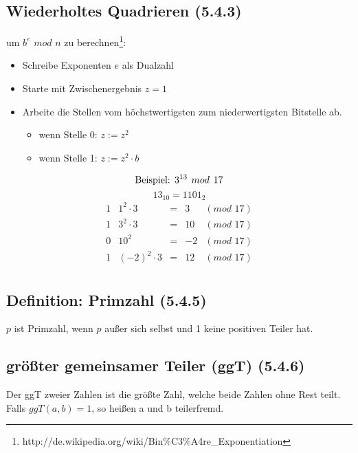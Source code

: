 \subsection{Wiederholtes Quadrieren (5.4.3)}
um $b^e \hspace{4pt} mod \hspace{4pt} n$ zu berechnen\footnote{http://de.wikipedia.org/wiki/Bin\%C3\%A4re\_Exponentiation}:
\begin{itemize}
  \item Schreibe Exponenten $e$ als Dualzahl
  \item Starte mit Zwischenergebnis $z = 1$
  \item Arbeite die Stellen vom höchstwertigsten zum niederwertigsten Bitstelle ab.
  	\begin{itemize}
  		\item wenn Stelle 0: $z := z^2$
  		\item wenn Stelle 1: $z := z^2 \cdot b$
		\end{itemize}
\end{itemize}

$$\textnormal{Beispiel: } 3^{13} \hspace{4pt} mod \hspace{4pt} 17$$
$$13_{10} = 1101_2$$
$$
\begin{array}{crclc}
	1 & 1^2 \cdot 3 & = & 3 &  (mod \hspace{4pt} 17) \\
	1 & 3^2 \cdot 3 & = & 10 &  (mod \hspace{4pt} 17) \\
	0 & 10^2 & = & -2 &  (mod \hspace{4pt} 17) \\
	1 & (-2)^2 \cdot 3 & = & 12 &  (mod \hspace{4pt} 17) \\
\end{array}
$$

\subsection{Definition: Primzahl (5.4.5)}
$p$ ist Primzahl, wenn $p$ außer sich selbst und 1 keine positiven Teiler hat.

\subsection{größter gemeinsamer Teiler (ggT) (5.4.6)}
Der ggT zweier Zahlen ist die größte Zahl, welche beide Zahlen ohne Rest teilt. \\
Falls $ggT(a,b) = 1$, so heißen a und b teilerfremd.

